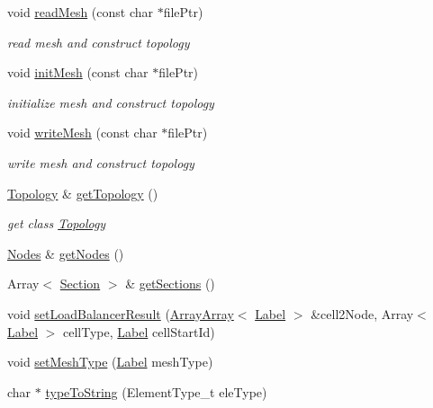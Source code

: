 \begin{DoxyCompactItemize}
void \hyperlink{classHSF_1_1Mesh_aa9073cb283b0b0be1a6131fc14fbabf3}{readMesh} (const char $\ast$filePtr)
\begin{DoxyCompactList}\small\item\em read mesh and construct topology \item\end{DoxyCompactList}\item 
void \hyperlink{classHSF_1_1Mesh_aeadaa406bc94ca79dbac39b69f0929a2}{initMesh} (const char $\ast$filePtr)
\begin{DoxyCompactList}\small\item\em initialize mesh and construct topology \item\end{DoxyCompactList}\item 
void \hyperlink{classHSF_1_1Mesh_a2cd3b5d0f1dcf97d7b4cb565b32bcaf8}{writeMesh} (const char $\ast$filePtr)
\begin{DoxyCompactList}\small\item\em write mesh and construct topology \item\end{DoxyCompactList}\item 
\hyperlink{classHSF_1_1Topology}{Topology} \& \hyperlink{classHSF_1_1Mesh_a3a340c548e7bf152dc70722cb64ab61c}{getTopology} ()
\begin{DoxyCompactList}\small\item\em get class \hyperlink{classHSF_1_1Topology}{Topology} \item\end{DoxyCompactList}\item 
\hyperlink{classHSF_1_1Nodes}{Nodes} \& \hyperlink{classHSF_1_1Mesh_aef198f95314eb6938a1713b07337155f}{getNodes} ()
\item 
Array$<$ \hyperlink{classHSF_1_1Section}{Section} $>$ \& \hyperlink{classHSF_1_1Mesh_a4c3c5c8a8ccd5413c01c05592863a5ea}{getSections} ()
\item 
void \hyperlink{classHSF_1_1Mesh_aef90381f0de5a072b710906f955717fd}{setLoadBalancerResult} (\hyperlink{classHSF_1_1ArrayArray}{ArrayArray}$<$ \hyperlink{namespaceHSF_ae65d72be782e989396ebe5ec6ae4c2b6}{Label} $>$ \&cell2Node, Array$<$ \hyperlink{namespaceHSF_ae65d72be782e989396ebe5ec6ae4c2b6}{Label} $>$ cellType, \hyperlink{namespaceHSF_ae65d72be782e989396ebe5ec6ae4c2b6}{Label} cellStartId)
\item 
void \hyperlink{classHSF_1_1Mesh_a00a74cf612e08f90f88ada5c33a2a802}{setMeshType} (\hyperlink{namespaceHSF_ae65d72be782e989396ebe5ec6ae4c2b6}{Label} meshType)
\item 
char $\ast$ \hyperlink{classHSF_1_1Mesh_a5e48ab70f682c324a222208fceb66388}{typeToString} (ElementType\_\-t eleType)
\end{DoxyCompactItemize}


